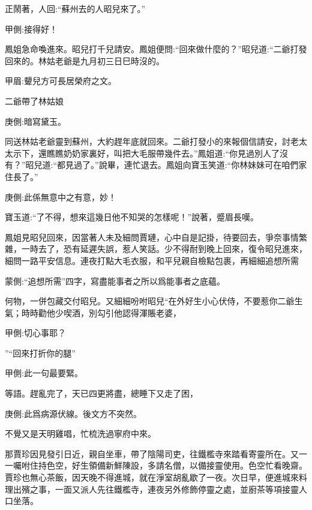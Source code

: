 \begin{parag}
    正鬧著，人回:“蘇州去的人昭兒來了。”\begin{note}甲側:接得好！\end{note}鳳姐急命喚進來。昭兒打千兒請安。鳳姐便問:“回來做什麼的？”昭兒道:“二爺打發回來的。林姑老爺是九月初三日巳時沒的。\begin{note}甲眉:顰兒方可長居榮府之文。\end{note}二爺帶了林姑娘\begin{note}庚側:暗寫黛玉。\end{note}同送林姑老爺靈到蘇州，大約趕年底就回來。二爺打發小的來報個信請安，討老太太示下，還瞧瞧奶奶家裏好，叫把大毛服帶幾件去。”鳳姐道:“你見過別人了沒有？”昭兒道:“都見過了。”說畢，連忙退去。鳳姐向寶玉笑道:“你林妹妹可在咱們家住長了。”\begin{note}庚側:此係無意中之有意，妙！\end{note}寶玉道:“了不得，想來這幾日他不知哭的怎樣呢！”說著，蹙眉長嘆。
\end{parag}


\begin{parag}
    鳳姐見昭兒回來，因當著人未及細問賈璉，心中自是記掛，待要回去，爭奈事情繁雜，一時去了，恐有延遲失誤，惹人笑話。少不得耐到晚上回來，復令昭兒進來，細問一路平安信息。連夜打點大毛衣服，和平兒親自檢點包裹，再細細追想所需\begin{note}蒙側:“追想所需”四字，寫盡能事者之所以爲能事者之底蘊。\end{note}何物，一併包藏交付昭兒。又細細吩咐昭兒“在外好生小心伏侍，不要惹你二爺生氣；時時勸他少喫酒，別勾引他認得渾賬老婆，\begin{note}甲側:切心事耶？\end{note}”“回來打折你的腿”\begin{note}甲側:此一句最要緊。\end{note}等語。趕亂完了，天已四更將盡，總睡下又走了困，\begin{note}庚側:此爲病源伏線。後文方不突然。\end{note}不覺又是天明雞唱，忙梳洗過寧府中來。
\end{parag}


\begin{parag}
    那賈珍因見發引日近，親自坐車，帶了陰陽司吏，往鐵檻寺來踏看寄靈所在。又一一囑咐住持色空，好生領備新鮮陳設，多請名僧，以備接靈使用。色空忙看晚齋。賈珍也無心茶飯，因天晚不得進城，就在淨室胡亂歇了一夜。次日早，便進城來料理出殯之事，一面又派人先往鐵檻寺，連夜另外修飾停靈之處，並廚茶等項接靈人口坐落。
\end{parag}


